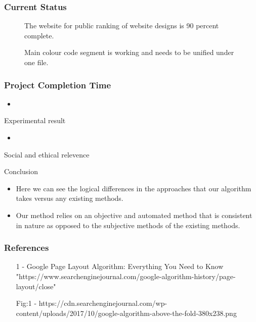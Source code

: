 \documentclass[11pt]{beamer}
\begin{document}
	\begin{frame}
	\frametitle{{Current Status}}
		\begin{figure}
		\item The website for public ranking of website designs is 90 percent complete.
		\item Main colour code segment is working and needs to be unified under one file.
	\end{figure}
	\end{frame}
\begin{frame}
			\frametitle{{Project Completion Time}}
	\begin{itemize}
		\item
	\end{itemize}
\end{frame}

\begin{frame}{Experimental result}
			\begin{itemize}
				\item
			\end{itemize}	
	\end{frame}

	\begin{frame}{Social and ethical relevence}
		\begin{itemsize}
			\item
		\end{itemsize}
\end{frame}

	\begin{frame}{Conclusion}
		\begin{itemize}
			\item Here we can see the logical differences in the approaches that our algorithm takes versus any existing methods.
			\item Our method relies on an objective and automated method that is consistent in nature as opposed to the subjective methods of the existing methods.
		\end{itemize}
	\end{frame}
	\begin{frame}
		\frametitle{\LARGE \textbf{References}}
		\begin{itemize}
			\item [1] - Google Page Layout Algorithm: Everything You Need to Know 
			"https://www.searchenginejournal.com/google-algorithm-history/page-layout/close"
			\item [Fig:1] - https://cdn.searchenginejournal.com/wp-content/uploads/2017/10/google-algorithm-above-the-fold-380x238.png
		\end{itemize}
	\end{frame}
\end{document}

